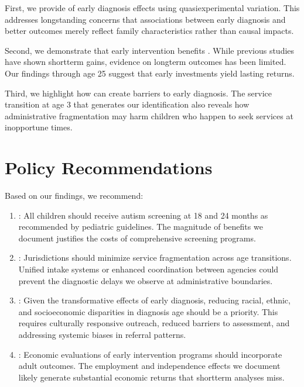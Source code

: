 \documentclass[letterpaper,10pt,english]{jupyterBook}
\begin{document}
\sphinxAtStartPar
First, we provide  of early diagnosis effects using quasi\sphinxhyphen{}experimental variation. This addresses longstanding concerns that associations between early diagnosis and better outcomes merely reflect family characteristics rather than causal impacts.

\sphinxAtStartPar
Second, we demonstrate that early intervention benefits . While previous studies have shown short\sphinxhyphen{}term gains, evidence on long\sphinxhyphen{}term outcomes has been limited. Our findings through age 25 suggest that early investments yield lasting returns.

\sphinxAtStartPar
Third, we highlight how  can create barriers to early diagnosis. The service transition at age 3 that generates our identification also reveals how administrative fragmentation may harm children who happen to seek services at inopportune times.


\section{Policy Recommendations}
\label{\detokenize{conclusion:policy-recommendations}}
\sphinxAtStartPar
Based on our findings, we recommend:
\begin{enumerate}
%
\item {} 
\sphinxAtStartPar
{}: All children should receive autism screening at 18 and 24 months as recommended by pediatric guidelines. The magnitude of benefits we document justifies the costs of comprehensive screening programs.

\item {} 
\sphinxAtStartPar
{}: Jurisdictions should minimize service fragmentation across age transitions. Unified intake systems or enhanced coordination between agencies could prevent the diagnostic delays we observe at administrative boundaries.

\item {} 
\sphinxAtStartPar
{}: Given the transformative effects of early diagnosis, reducing racial, ethnic, and socioeconomic disparities in diagnosis age should be a priority. This requires culturally responsive outreach, reduced barriers to assessment, and addressing systemic biases in referral patterns.

\item {} 
\sphinxAtStartPar
{}: Economic evaluations of early intervention programs should incorporate adult outcomes. The employment and independence effects we document likely generate substantial economic returns that short\sphinxhyphen{}term analyses miss.

\end{enumerate}
\end{document}
